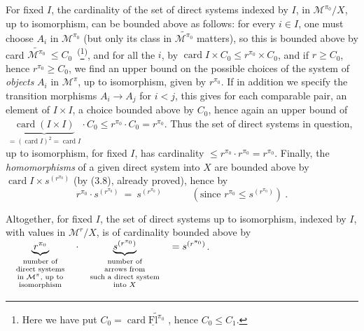 \documentclass[11pt]{article}
\newcommand{\printedpage}[1]{\marginpar{\footnotesize p.~#1}}
\newcommand{\msp}[1]{\marginpar{\footnotesize [#1]}}
\newcommand{\M}{\mathcal{M}}
\newcommand{\uFl}{\underline{\mathrm{Fl}}}
\newcommand{\card}{\operatorname{card}}
\newcommand{\wavy}[1]{\widetilde{#1}}
\begin{document}
\printedpage{15}
For fixed $I$, the cardinality of the set of direct systems indexed by $I$, in $\M^{\pi_0}/X$, up to isomorphism, can be bounded above as follows: for every $i\in I$, one must choose $A_i$ in $\M^{\pi_0}$ (but only its class in $\wavy{\M^{\pi_0}}$ matters), so this is bounded above by card $\wavy{\M^{\pi_0}}\ \leq C_0$~\textsuperscript{(}\footnote[7]{Here we have put $C_0=\card\wavy{\uFl^{\pi_0}}$ , hence $C_0\leq C_1$.}\textsuperscript{)}, and for all the $i$, by $\card I\times C_0\leq r^{\pi_0}\times C_0$, and if $r\geq C_0$, hence $r^{\pi_0}\geq C_0$, we find an upper bound on the possible choices of the system of \textit{objects} $A_i$ in $\M^\pi$, up to isomorphism, given by $r^{\pi_0}$. If in addition we specify the transition morphisms $A_i\longrightarrow A_j$ for $i<j$, this gives for each comparable pair, an element of $I\times I$, a choice bounded above by $C_0$, hence again an upper bound of $\ \underbrace{\card(I\times I)}_{=(\card I)^2=\card I}\cdot C_0\leq r^{\pi_0}\cdot C_0=r^{\pi_0}$. Thus the set of direct systems in question, up to isomorphism, for fixed $I$, has cardinality $\leq r^{\pi_0}\cdot r^{\pi_0}=r^{\pi_0}$. Finally, the \textit{homomorphisms} of a given direct system into $X$ are bounded above by $\card I\times s^{(r^{\pi_0})}$ (by (3.8), already proved), hence by
\[
r^{\pi_0}\cdot s^{(r^{\pi_0})}\ =\ s^{(r^{\pi_0})}\qquad\quad(\text{since } r^{\pi_0}\leq s^{(r^{\pi_0})})\ .
\]

Altogether, for fixed $I$, the set of direct systems up to isomorphism, indexed by $I$, with values in $\M^r/X$, is \msp{page 22} of cardinality bounded above by $\quad\underbrace{r^{\pi_0}}_{\text{\scriptsize\begin{tabular}{@{}c@{}}number of\\ direct systems\\ in $\M^\pi$, up to\\ isomorphism\end{tabular}}}\quad\cdot\quad\underbrace{s^{(r^{\pi_0})}}_{\text{\scriptsize\begin{tabular}{@{}c@{}}number of\\ arrows from\\ such a direct system\\ into $X$\end{tabular}}}\quad=s^{(r^{\pi_0})}$.
\end{document}
